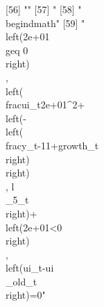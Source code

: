  [56] ""                                                                                                                                                                                                                                                                                                                                                                                                                                                                                                                                                                                                                                             
 [57] "%
 [58] "\\begin{dmath}"                                                                                                                                                                                                                                                                                                                                                                                                                                                                                                                                                                                                                               
 [59] "\\left(2e+01\\geq 0\\right)\\, \\left(\\frac{{ui_{t}}}{2e+01^{2}}+\\left(-\\left(\\frac{{y_{t-1}}}{1+{growth_{t}}}\\right)\\right)\\, {{l\\_5}_{t}}\\right)+\\left(2e+01<0\\right)\\, \\left({ui_{t}}-{{ui\\_old}_{t}}\\right)=0"                                                                                                                                                                                                                                                                                                                                                                                                             
